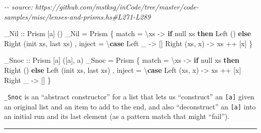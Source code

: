 \documentclass[]{article}
\newenvironment{Shaded}{}{}
\newcommand{\CommentTok}[1]{\textcolor[rgb]{0.38,0.63,0.69}{\textit{#1}}}
\newcommand{\DataTypeTok}[1]{\textcolor[rgb]{0.56,0.13,0.00}{#1}}
\newcommand{\FunctionTok}[1]{\textcolor[rgb]{0.02,0.16,0.49}{#1}}
\newcommand{\KeywordTok}[1]{\textcolor[rgb]{0.00,0.44,0.13}{\textbf{#1}}}
\newcommand{\NormalTok}[1]{#1}
\newcommand{\OperatorTok}[1]{\textcolor[rgb]{0.40,0.40,0.40}{#1}}
\newcommand{\OtherTok}[1]{\textcolor[rgb]{0.00,0.44,0.13}{#1}}
\begin{document}
\begin{Shaded}
\begin{Highlighting}[]
\CommentTok{{-}{-} source: https://github.com/mstksg/inCode/tree/master/code{-}samples/misc/lenses{-}and{-}prisms.hs\#L271{-}L289}

\OtherTok{\_Nil\textquotesingle{} ::} \DataTypeTok{Prism\textquotesingle{}}\NormalTok{ [a] ()}
\NormalTok{\_Nil\textquotesingle{} }\OtherTok{=} \DataTypeTok{Prism\textquotesingle{}}
\NormalTok{    \{ match  }\OtherTok{=}\NormalTok{ \textbackslash{}xs }\OtherTok{{-}\textgreater{}} \KeywordTok{if} \FunctionTok{null}\NormalTok{ xs}
        \KeywordTok{then} \DataTypeTok{Left}\NormalTok{  ()}
        \KeywordTok{else} \DataTypeTok{Right}\NormalTok{ (}\FunctionTok{init}\NormalTok{ xs, }\FunctionTok{last}\NormalTok{ xs)}
\NormalTok{    , inject }\OtherTok{=}\NormalTok{ \textbackslash{}}\KeywordTok{case}
        \DataTypeTok{Left}\NormalTok{ \_        }\OtherTok{{-}\textgreater{}}\NormalTok{ []}
        \DataTypeTok{Right}\NormalTok{ (xs, x) }\OtherTok{{-}\textgreater{}}\NormalTok{ xs }\OperatorTok{++}\NormalTok{ [x]}
\NormalTok{    \}}

\OtherTok{\_Snoc ::} \DataTypeTok{Prism\textquotesingle{}}\NormalTok{ [a] ([a], a)}
\NormalTok{\_Snoc }\OtherTok{=} \DataTypeTok{Prism\textquotesingle{}}
\NormalTok{    \{ match  }\OtherTok{=}\NormalTok{ \textbackslash{}xs }\OtherTok{{-}\textgreater{}} \KeywordTok{if} \FunctionTok{null}\NormalTok{ xs}
        \KeywordTok{then} \DataTypeTok{Right}\NormalTok{ ()}
        \KeywordTok{else} \DataTypeTok{Left}\NormalTok{  (}\FunctionTok{init}\NormalTok{ xs, }\FunctionTok{last}\NormalTok{ xs)}
\NormalTok{    , inject }\OtherTok{=}\NormalTok{ \textbackslash{}}\KeywordTok{case}
        \DataTypeTok{Left}\NormalTok{  (xs, x) }\OtherTok{{-}\textgreater{}}\NormalTok{ xs }\OperatorTok{++}\NormalTok{ [x]}
        \DataTypeTok{Right}\NormalTok{ \_       }\OtherTok{{-}\textgreater{}}\NormalTok{ []}
\NormalTok{    \}}
\end{Highlighting}
\end{Shaded}

\texttt{\_Snoc} is an ``abstract constructor'' for a list that lets us
``construct'' an \texttt{{[}a{]}} given an original list and an item to add to
the end, and also ``deconstruct'' an \texttt{{[}a{]}} into an initial run and
its last element (as a pattern match that might ``fail'').

\begin{center}\rule{0.5\linewidth}{0.5pt}\end{center}
\end{document}
